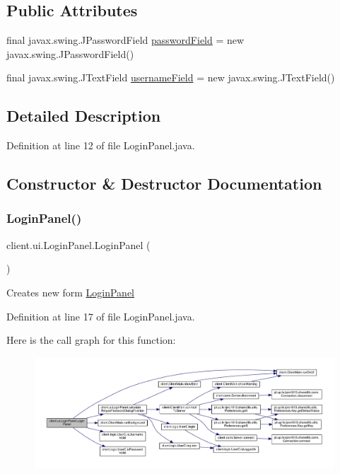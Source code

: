 \subsection*{Public Attributes}
\begin{DoxyCompactItemize}
\item 
final javax.\+swing.\+J\+Password\+Field \hyperlink{classclient_1_1ui_1_1_login_panel_a4b3258e8faace6462f58c79cb4a08835}{password\+Field} = new javax.\+swing.\+J\+Password\+Field()
\item 
final javax.\+swing.\+J\+Text\+Field \hyperlink{classclient_1_1ui_1_1_login_panel_a3a01950b4312782aa5d78d22d257e19e}{username\+Field} = new javax.\+swing.\+J\+Text\+Field()
\end{DoxyCompactItemize}


\subsection{Detailed Description}


Definition at line 12 of file Login\+Panel.\+java.



\subsection{Constructor \& Destructor Documentation}
\hypertarget{classclient_1_1ui_1_1_login_panel_a697f38b937f048e562c634c713d90885}{}\label{classclient_1_1ui_1_1_login_panel_a697f38b937f048e562c634c713d90885} 
\subsubsection{\texorpdfstring{Login\+Panel()}{LoginPanel()}}
{\footnotesize\ttfamily client.\+ui.\+Login\+Panel.\+Login\+Panel (\begin{DoxyParamCaption}{ }\end{DoxyParamCaption})}

Creates new form \hyperlink{classclient_1_1ui_1_1_login_panel}{Login\+Panel} 

Definition at line 17 of file Login\+Panel.\+java.

Here is the call graph for this function\+:
\nopagebreak
\begin{figure}[H]
\begin{center}
\leavevmode
\includegraphics[width=350pt]{classclient_1_1ui_1_1_login_panel_a697f38b937f048e562c634c713d90885_cgraph}
\end{center}
\end{figure}


